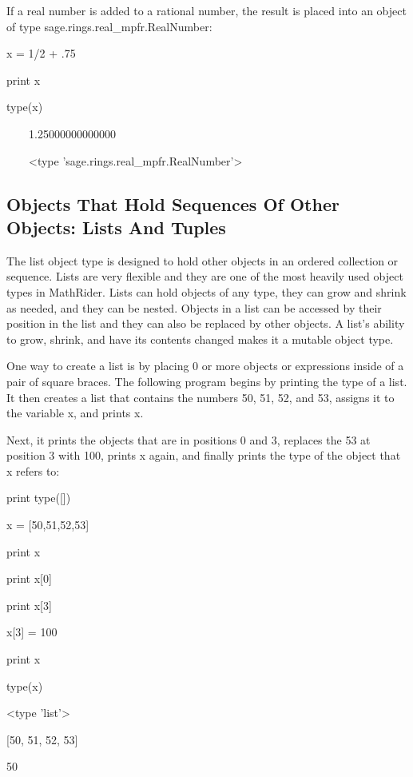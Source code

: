 \documentclass[12pt,oneside]{book}
\begin{document}
If a real number is added to a rational number, the result is placed into an object of type sage.rings.real\_mpfr.RealNumber: 

x = 1/2 + .75

print x

type(x)

{\textbar}

\ \ \ \ 1.25000000000000

\ \ \ \ {\textless}type 'sage.rings.real\_mpfr.RealNumber'{\textgreater}

\subsection[Objects That Hold Sequences Of Other Objects: Lists And Tuples]{ Objects That Hold Sequences Of Other Objects: Lists And Tuples}

The list object type is designed to hold other objects in an ordered collection or sequence. Lists are very flexible and they are one of the most heavily used object types in MathRider. Lists can hold objects of any type, they can grow and shrink as needed, and they can be nested. Objects in a list can be accessed by their position in the list and they can also be replaced by other objects. A list's ability to grow, shrink, and have its contents changed makes it a mutable object type.

One way to create a list is by placing 0 or more objects or expressions inside of a pair of square braces. The following program begins by printing the type of a list. It then creates a list that contains the numbers 50, 51, 52, and 53, assigns it to the variable x, and prints x.

Next, it prints the objects that are in positions 0 and 3, replaces the 53 at position 3 with 100, prints x again, and finally prints the type of the object that x refers to: 

print type([])

x = [50,51,52,53]

print x

print x[0]

print x[3]

x[3] = 100

print x

type(x)

{\textbar}

{\textless}type 'list'{\textgreater}

[50, 51, 52, 53]

50
\end{document}
